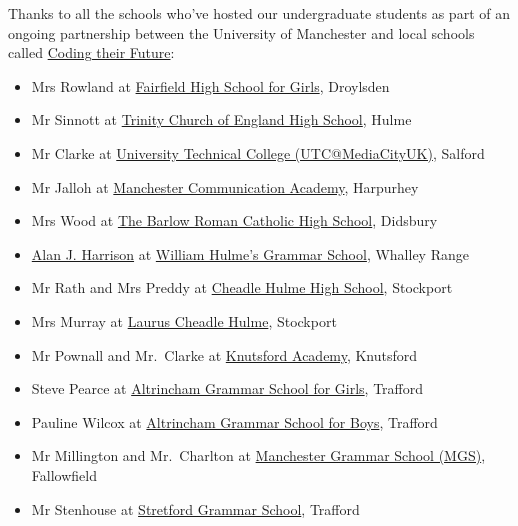 \documentclass[
]{book}
\providecommand{\tightlist}{%
  \setlength{\itemsep}{0pt}\setlength{\parskip}{0pt}}
\begin{document}
Thanks to all the schools who've hosted our undergraduate students as part of an ongoing partnership between the University of Manchester and local schools called \href{https://personalpages.manchester.ac.uk/staff/duncan.hull/coding-their-future}{Coding their Future}:

\begin{itemize}
\tightlist
\item
  Mrs Rowland at \href{https://en.wikipedia.org/wiki/Fairfield_High_School_for_Girls}{Fairfield High School for Girls}, Droylsden
\item
  Mr Sinnott at \href{https://en.wikipedia.org/wiki/Trinity_Church_of_England_High_School}{Trinity Church of England High School}, Hulme
\item
  Mr Clarke at \href{https://en.wikipedia.org/wiki/Aldridge_UTC@MediaCityUK}{University Technical College (UTC@MediaCityUK)}, Salford
\item
  Mr Jalloh at \href{https://en.wikipedia.org/wiki/Manchester_Communication_Academy}{Manchester Communication Academy}, Harpurhey
\item
  Mrs Wood at \href{https://en.wikipedia.org/wiki/The_Barlow_Roman_Catholic_High_School}{The Barlow Roman Catholic High School}, Didsbury
\item
  \href{https://www.amazon.co.uk/Alan-J-Harrison/e/B09GTC2DR6/}{Alan J. Harrison} at \href{https://en.wikipedia.org/wiki/William_Hulme\%27s_Grammar_School}{William Hulme's Grammar School}, Whalley Range
\item
  Mr Rath and Mrs Preddy at \href{https://en.wikipedia.org/wiki/Cheadle_Hulme_High_School}{Cheadle Hulme High School}, Stockport
\item
  Mrs Murray at \href{https://www.lauruscheadlehulme.org.uk/}{Laurus Cheadle Hulme}, Stockport
\item
  Mr Pownall and Mr.~Clarke at \href{https://en.wikipedia.org/wiki/Knutsford_Academy}{Knutsford Academy}, Knutsford
\item
  Steve Pearce at \href{https://en.wikipedia.org/wiki/Altrincham_Grammar_School_for_Girls}{Altrincham Grammar School for Girls}, Trafford
\item
  Pauline Wilcox at \href{https://en.wikipedia.org/wiki/Altrincham_Grammar_School_for_Boys}{Altrincham Grammar School for Boys}, Trafford
\item
  Mr Millington and Mr.~Charlton at \href{https://en.wikipedia.org/wiki/Manchester_Grammar_School}{Manchester Grammar School (MGS)}, Fallowfield
\item
  Mr Stenhouse at \href{https://en.wikipedia.org/wiki/Stretford_Grammar_School}{Stretford Grammar School}, Trafford
\end{itemize}
\end{document}
